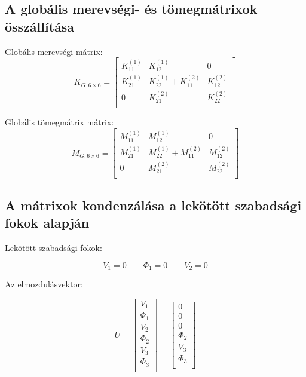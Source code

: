 \documentclass{article}
\begin{document}
	
	
	\subsection{A globális merevségi- és tömegmátrixok összállítása}
		
		Globális merevségi mátrix:
		\begin{equation}
			K_{G,6\times6}=
			\begin{bmatrix}
			K_{11}^{(1)} & K_{12}^{(1)}              & 0            \\
			K_{21}^{(1)} & K_{22}^{(1)}+K_{11}^{(2)} & K_{12}^{(2)} \\
			0            & K_{21}^{(2)}              & K_{22}^{(2)} \\
			\end{bmatrix}
		\end{equation}
		
		Globális tömegmátrix mátrix:
		\begin{equation}
			M_{G,6\times6}=
			\begin{bmatrix}
			M_{11}^{(1)} & M_{12}^{(1)}              & 0            \\
			M_{21}^{(1)} & M_{22}^{(1)}+M_{11}^{(2)} & M_{12}^{(2)} \\
			0            & M_{21}^{(2)}              & M_{22}^{(2)} \\
			\end{bmatrix}
		\end{equation}
	 
	
	\subsection{A mátrixok kondenzálása a lekötött szabadsági fokok alapján}
	
		Lekötött szabadsági fokok:
		
		\[V_{1}=0 \qquad \Phi_{1}=0 \qquad V_{2}=0\]	
	
		Az elmozdulásvektor:
		
		\begin{equation}
			U=
			\begin{bmatrix}
			V_{1}    \\
			\Phi_{1} \\
			V_{2}    \\
			\Phi_{2} \\
			V_{3}    \\
			\Phi_{3} \\
			\end{bmatrix}
			=
			\begin{bmatrix}
			0  \\
			0 \\
			0    \\
			\Phi_{2} \\
			V_{3}    \\
			\Phi_{3} \\
			\end{bmatrix}
		\end{equation}
		
\end{document}
